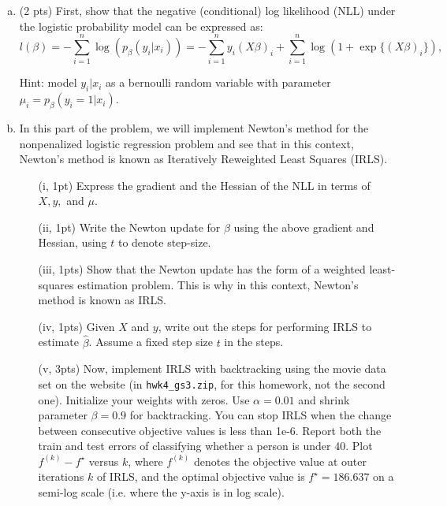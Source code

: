 \documentclass{article}
\theoremstyle{remark}
\theoremstyle{definition}
\begin{document}
\begin{enumerate}[(a)]
    \item (2 pts) First, show that the negative (conditional) log likelihood (NLL) under the logistic probability model can be expressed as: 
  \[
    l(\beta) = -\sum_{i=1}^{n} \log(p_{\beta}(y_i | x_i)) = -\sum_{i=1}^{n}y_i(X\beta)_i + \sum_{i=1}^{n}\log(1 +
    \exp\{(X\beta)_i\}),
  \]

    Hint: model $y_i|x_i$ as a bernoulli random variable with parameter $\mu_i = p_{\beta}(y_i = 1|x_i)$.
    \item In this part of the problem, we will implement Newton's method for the nonpenalized logistic regression problem and see that in this context, Newton's method is known as Iteratively Reweighted Least Squares (IRLS).
        \begin{enumerate}
    	\item[(i, 1pt)] Express the gradient and the Hessian of the NLL in terms of $X,y,$ and $\mu$.
    	\item[(ii, 1pt)] Write the Newton update for $\beta$ using the above gradient and Hessian, using $t$ to denote step-size.
    	\item[(iii, 1pts)] Show that the Newton update has the form of a weighted least-squares estimation problem. This is why in this context, Newton's method is known as IRLS.
    	\item[(iv, 1pts)] Given $X$ and $y$, write out the steps for performing IRLS to estimate $\hat{\beta}$. Assume a fixed step size $t$ in the steps.
        \item[(v, 3pts)] Now, implement IRLS with backtracking using the movie data set on the website (in \texttt{hwk4\_gs3.zip}, for this homework, not the second one). Initialize your weights with zeros. Use $\alpha = 0.01$ and shrink parameter $\beta = 0.9$ for backtracking. You can stop IRLS when the change between consecutive objective values is less than 1e-6. Report both the train and test errors of classifying whether a person is under $40$. Plot $f^{(k)} - f^{\star}$ versus $k$,  where $f^{(k)}$ denotes the objective value at outer iterations $k$ of IRLS, and the optimal objective value is $f^\star = 186.637$ on a semi-log scale (i.e. where the y-axis is in log scale).
        \end{enumerate}


\end{enumerate}
\end{document}
